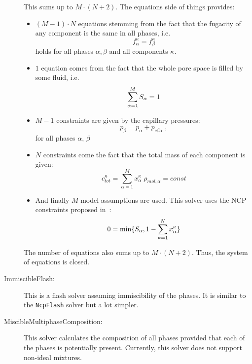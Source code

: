 \begin{description}
\begin{itemize}
  \end{itemize}
  This sums up to $M\cdot(N + 2)$. The equations side of things
  provides:
  \begin{itemize}
  \item $(M - 1)\cdot N$ equations stemming from the fact that the
    fugacity of any component is the same in all phases, i.e.
    \[
    f^\kappa_\alpha = f^\kappa_\beta
    \]
    holds for all phases $\alpha, \beta$ and all components $\kappa$.
  \item $1$ equation comes from the fact that the whole pore space is
    filled by some fluid, i.e.
    \[
    \sum_{\alpha=1}^M S_\alpha = 1
    \]
  \item $M - 1$ constraints are given by the capillary pressures:
    \[ 
    p_\beta = p_\alpha + p_{c\beta\alpha} \;,
    \]
    for all phases $\alpha$, $\beta$
  \item $N$ constraints come the fact that the total mass of each
    component is given:
    \[
    c^\kappa_{tot} = \sum_{\alpha=1}^M x_\alpha^\kappa\;\rho_{mol,\alpha} = const
    \]
  \item And finally $M$ model assumptions are used. This solver uses
    the NCP constraints proposed in~\cite{LHHW2011}:
    \[
     0 = \mathrm{min}\{S_\alpha, 1 - \sum_{\kappa=1}^N x_\alpha^\kappa\}
   \]
\end{itemize}
The number of equations also sums up to $M\cdot(N + 2)$. Thus, the
system of equations is closed.
\item[ImmiscibleFlash:] This is a flash solver assuming immiscibility
  of the phases. It is similar to the \texttt{NcpFlash} solver but a
  lot simpler.
\item[MiscibleMultiphaseComposition:] This solver calculates the
  composition of all phases provided that each of the phases is
  potentially present. Currently, this solver does not support
  non-ideal mixtures.
\end{description}

